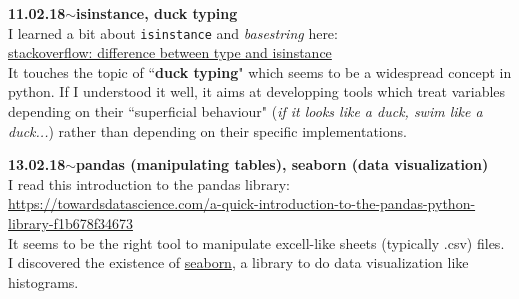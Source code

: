 \documentclass[11pt,a4paper]{article}
\newenvironment{loggentry}[2]%
{\noindent\textbf{#1}\hspace{1cm}$\mathbf{\sim}$\text{ }\textbf{#2}\\}{\vspace{0.5cm}}
\begin{document}
\begin{loggentry}{11.02.18}{isinstance, duck typing}
I learned a bit about \texttt{isinstance} and \textit{basestring} here:\\
\href{https://stackoverflow.com/questions/1549801/what-are-the-differences-between-type-and-isinstance#1549814}{stackoverflow: difference between type and isinstance}\\
It touches the topic of ``\textbf{duck typing}" which seems to be a widespread concept in python. If I understood it well, it aims at developping tools which treat variables depending on their ``superficial behaviour" (\textit{if it looks like a duck, swim like a duck...}) rather than depending on their specific implementations.\\
\end{loggentry}

\begin{loggentry}{13.02.18}{pandas (manipulating tables), seaborn (data visualization)}
I read this introduction to the pandas library:\\
\url{https://towardsdatascience.com/a-quick-introduction-to-the-pandas-python-library-f1b678f34673}\\
It seems to be the right tool to manipulate excell-like sheets (typically .csv) files.\\
I discovered the existence of \href{https://seaborn.pydata.org/index.html}{seaborn}, a library to do data visualization like histograms.
\end{loggentry}
\end{document}
